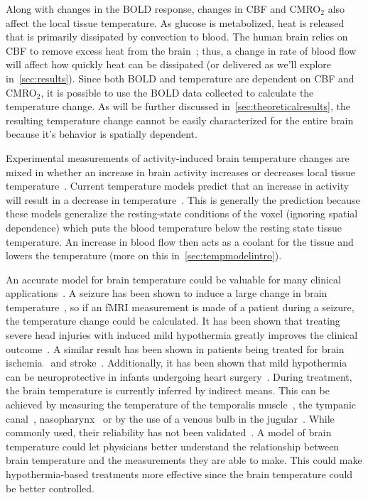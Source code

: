 Along with changes in the BOLD response, changes in CBF and CMRO$_2$ also affect the local tissue temperature. As glucose is metabolized, heat is released that is primarily dissipated by convection to blood.  The human brain relies on CBF to remove excess heat from the brain~\citep{karbowski2009}; thus, a change in rate of blood flow will affect how quickly heat can be dissipated (or delivered as we'll explore in~\cref{sec:results}).  Since both BOLD and temperature are dependent on CBF and CMRO$_2$, it is possible to use the BOLD data collected to calculate the temperature change. As will be further discussed in~\cref{sec:theoreticalresults}, the resulting temperature change cannot be easily characterized for the entire brain because it's behavior is spatially dependent.

Experimental measurements of activity-induced brain temperature changes are mixed in whether an increase in brain activity increases or decreases local tissue temperature~\citep{mcelligott,kiyatkin,zeschke,george,tachibana}. Current temperature models predict that an increase in activity will result in a decrease in temperature~\citep{sotero2011,yablonskiy,trubel}.  This is generally the prediction because these models generalize the resting-state conditions of the voxel (ignoring spatial dependence) which puts the blood temperature below the resting state tissue temperature.  An increase in blood flow then acts as a coolant for the tissue and lowers the temperature (more on this in~\cref{sec:tempmodelintro}).

An accurate model for brain temperature could be valuable for many clinical applications~\citep{bertolizio2011}.  A seizure has been shown to induce a large change in brain temperature~\citep{trubel2004}, so if an fMRI measurement is made of a patient during a seizure, the temperature change could be calculated.  It has been shown that treating severe head injuries with induced mild hypothermia greatly improves the clinical outcome~\citep{soukup2002}.  A similar result has been shown in patients being treated for brain ischemia~\citep{maher1993,ginsberg1992} and stroke~\citep{krieger2001}.  Additionally, it has been shown that mild hypothermia can be neuroprotective in infants undergoing heart surgery~\citep{dominguez2003}. During treatment, the brain temperature is currently inferred by indirect means.  This can be achieved by measuring the temperature of the temporalis muscle~\citep{suehiro2003}, the tympanic canal~\citep{baker1972,shiraki1988}, nasopharynx~\citep{stecker2001} or by the use of a venous bulb in the jugular~\citep{rumana1998,bissonnette2000}. While commonly used, their reliability has not been validated~\citep{shiraki1988,bissonnette2000}. A model of brain temperature could let physicians better understand the relationship between brain temperature and the measurements they are able to make. This could make hypothermia-based treatments more effective since the brain temperature could be better controlled.


